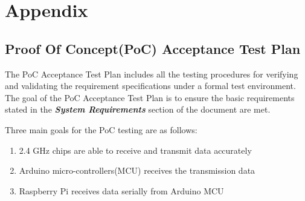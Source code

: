 %

\setcounter{section}{7}
\section{Appendix}

\subsection{Proof Of Concept(PoC) Acceptance Test Plan}

The PoC Acceptance Test Plan includes all the testing procedures for verifying and validating the requirement specifications under a formal test environment. The goal of the PoC Acceptance Test Plan is to ensure the basic requirements stated in the \textbf{\textit{System Requirements}} section of the document are met.

\medskip
Three main goals for the PoC testing are as follows:

\begin{enumerate} 
    \item 2.4 GHz chips are able to receive and transmit data accurately
    \item Arduino micro-controllers(MCU) receives the transmission data 
    \item Raspberry Pi receives data serially from Arduino MCU
\end{enumerate}

